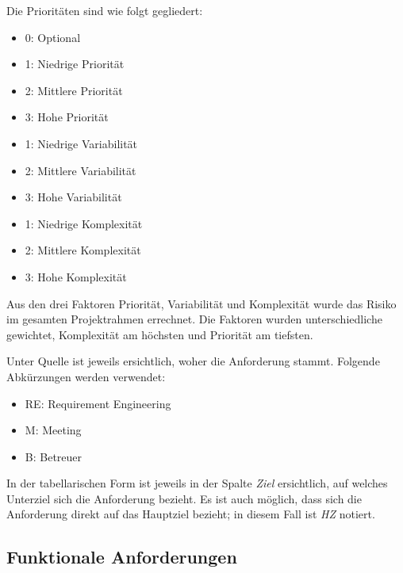 Die Prioritäten sind wie folgt gegliedert:
\begin{itemize}
	\item 0: Optional
	\item 1: Niedrige Priorität
	\item 2: Mittlere Priorität
	\item 3: Hohe Priorität
\end{itemize}

\begin{itemize}
	\item 1: Niedrige Variabilität
	\item 2: Mittlere Variabilität
	\item 3: Hohe Variabilität
\end{itemize}

\begin{itemize}
	\item 1: Niedrige Komplexität
	\item 2: Mittlere Komplexität
	\item 3: Hohe Komplexität
\end{itemize}

Aus den drei Faktoren Priorität, Variabilität und Komplexität wurde das Risiko im gesamten Projektrahmen errechnet. Die Faktoren wurden unterschiedliche gewichtet, Komplexität am höchsten und Priorität am tiefsten. 

Unter Quelle ist jeweils ersichtlich, woher die Anforderung stammt. Folgende Abkürzungen werden verwendet:
\begin{itemize}
	\item RE: Requirement Engineering
	\item M: Meeting
	\item B: Betreuer
\end{itemize}
In der tabellarischen Form ist jeweils in der Spalte \emph{Ziel} ersichtlich, auf welches Unterziel sich die Anforderung bezieht. Es ist auch möglich, dass sich die Anforderung direkt auf das Hauptziel bezieht; in diesem Fall ist \emph{HZ} notiert.

\subsection{Funktionale Anforderungen}
